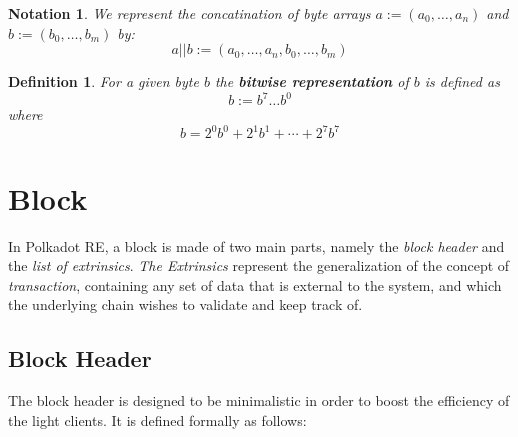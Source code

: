 \documentclass{article}
\newcommand{\assign}{:=}
\newcommand{\tmem}[1]{{\em #1\/}}
\newcommand{\tmstrong}[1]{\textbf{#1}}
\newcommand{\tmtextit}[1]{{\itshape{#1}}}
\newtheorem{definition}{Definition}
\newtheorem{notation}{Notation}
\begin{document}
\begin{notation}
  We represent the concatination of byte arrays $a \assign (a_0, \ldots, a_n)$
  and $b \assign (b_0, \ldots, b_m)$ by:
  \[ a | | b \assign (a_0, \ldots, a_n, b_0, \ldots, b_m) \]
\end{notation}

\begin{definition}
  \label{defn-bit-rep}For a given byte $b$ the {\tmstrong{bitwise
  representation}} of $b$ is defined as
  \[ b \assign b^7 \ldots b^0 \]
  where
  \[ b = 2^0 b^0 + 2^1 b^1 + \cdots + 2^7 b^7 \]
\end{definition}

\section{Block}

In Polkadot RE, a block is made of two main parts, namely the \tmtextit{block
header} and the \tmtextit{list of extrinsics}. {\tmem{The Extrinsics}}
represent the generalization of the concept of {\tmem{transaction}},
containing any set of data that is external to the system, and which the
underlying chain wishes to validate and keep track of.

\subsection{Block Header}\label{block}

The block header is designed to be minimalistic in order to boost the
efficiency of the light clients. It is defined formally as follows:
\end{document}

